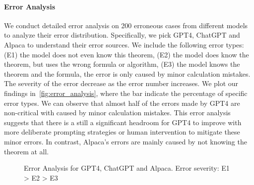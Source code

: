 \documentclass[11pt]{article}
\begin{document}
\paragraph{Error Analysis}
We conduct detailed error analysis on 200 erroneous cases from different models to analyze their error distribution. Specifically, we pick GPT4, ChatGPT and Alpaca to understand their error sources. We include the following error types: (E1) the model does not even know this theorem, (E2) the model does know the theorem, but uses the wrong formula or algorithm, (E3) the model knows the theorem and the formula, the error is only caused by minor calculation mistakes. The severity of the error decrease as the error number increases. We plot our findings in~\autoref{fig:error_analysis}, where the bar indicate the percentage of specific error types. We can observe that almost half of the errors made by GPT4 are non-critical with caused by minor calculation mistakes. This error analysis suggests that there is a still a significant headroom for GPT4 to improve with more deliberate prompting strategies or human intervention to mitigate these minor errors. In contrast, Alpaca's errors are mainly caused by not knowing the theorem at all. 

\begin{figure}
    \centering
    \clearpage{}\clearpage{}
    \vspace{-6ex}
    \caption{Error Analysis for GPT4, ChatGPT and Alpaca. Error severity: E1 > E2 > E3}
    \label{fig:error_analysis}
\end{figure}
\end{document}
